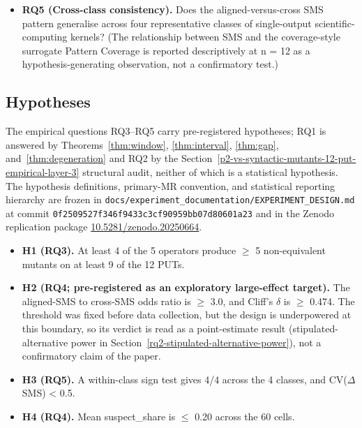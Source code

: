 \documentclass[manuscript,screen,review]{acmart}
\begin{document}
\begin{itemize}
  lie empirically, on which real and textbook programs does a strong
  MR kill the genuine fault, and where does the duality fail as a weak-MR
  false positive or as a surviving non-equivalent mutant; and does the
  construct separation among aggregate kill-rate, semantic alignment,
  and real-defect detection remain visible on an industrial arm of
  reproduced, MR-detectable defects from widely used
  scientific-computing libraries?
\item
  \textbf{RQ5 (Cross-class consistency).} Does the aligned-versus-cross
  SMS pattern generalise across four representative classes of
  single-output scientific-computing kernels? (The relationship between
  SMS and the coverage-style surrogate Pattern Coverage is reported
  descriptively at n = 12 as a hypothesis-generating observation, not a
  confirmatory test.)
\end{itemize}

\subsection{Hypotheses}\label{hypotheses}

The empirical questions RQ3--RQ5 carry pre-registered hypotheses; RQ1 is
answered by Theorems~\ref{thm:window}, \ref{thm:interval},
\ref{thm:gap}, and~\ref{thm:degeneration} and RQ2 by the Section~\ref{p2-vs-syntactic-mutants-12-put-empirical-layer-3} structural audit, neither of
which is a statistical hypothesis.
The hypothesis definitions, primary-MR convention, and statistical
reporting hierarchy are frozen in
\texttt{docs/experiment\_documentation/EXPERIMENT\_DESIGN.md} at commit
\texttt{0f2509527f346f9433c3cf90959bb07d80601a23} and in the Zenodo
replication package
\href{https://doi.org/10.5281/zenodo.20250664}{10.5281/zenodo.20250664}.

\begin{itemize}

\item
  \textbf{H1 (RQ3).} At least 4 of the 5 operators produce $\geq$ 5 non-equivalent
  mutants on at least 9 of the 12 PUTs.
\item
  \textbf{H2 (RQ4; pre-registered as an exploratory large-effect
  target).} The aligned-SMS to
  cross-SMS odds ratio is $\geq$ 3.0, and Cliff's $\delta$ is $\geq$ 0.474.
  The threshold was fixed before data collection, but the design is
  underpowered at this boundary, so its verdict is read as a
  point-estimate result
  (stipulated-alternative power in Section~\ref{rq2-stipulated-alternative-power}), not
  a confirmatory claim of the paper.
\item
  \textbf{H3 (RQ5).} A within-class sign test gives 4/4 across the 4 classes,
  and CV($\Delta$SMS) \textless{} 0.5.
\item
  \textbf{H4 (RQ4).} Mean suspect\_share is $\leq$ 0.20 across the 60 cells.
\end{itemize}
\end{document}
